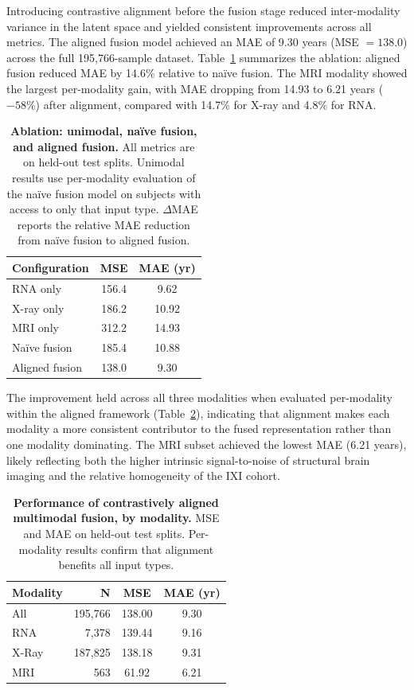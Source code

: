 \documentclass[10pt,twocolumn]{article}
\begin{document}
Introducing contrastive alignment before the fusion stage reduced inter-modality variance in the
latent space and yielded consistent improvements across all metrics. The aligned fusion model
achieved an MAE of 9.30 years (MSE $= 138.0$) across the full 195{,}766-sample
dataset. Table~\ref{tab:ablation} summarizes the ablation: aligned fusion reduced MAE by 14.6\%
relative to na\"ive fusion. The MRI modality showed the largest per-modality gain, with MAE
dropping from 14.93 to 6.21 years ($-58\%$) after alignment, compared with 14.7\% for X-ray
and 4.8\% for RNA.

\begin{table}[t]
\centering
\caption{
\textbf{Ablation: unimodal, na\"ive fusion, and aligned fusion.}
All metrics are on held-out test splits. Unimodal results use per-modality evaluation of the
na\"ive fusion model on subjects with access to only that input type. $\Delta$MAE reports the
relative MAE reduction from na\"ive fusion to aligned fusion.
}
\begin{tabular}{lcc}
\toprule
\textbf{Configuration} & \textbf{MSE} & \textbf{MAE (yr)} \\
\midrule
RNA only       & 156.4 &  9.62 \\
X-ray only     & 186.2 & 10.92 \\
MRI only       & 312.2 & 14.93 \\
\midrule
Na\"ive fusion   & 185.4 & 10.88 \\
Aligned fusion & 138.0 &  9.30 \\
\bottomrule
\end{tabular}
\label{tab:ablation}
\end{table}

The improvement held across all three modalities when evaluated per-modality within the aligned
framework (Table~\ref{tab:per_modality}), indicating that alignment makes each modality a more
consistent contributor to the fused representation rather than one modality dominating. The MRI
subset achieved the lowest MAE (6.21 years), likely reflecting both the higher intrinsic
signal-to-noise of structural brain imaging and the relative homogeneity of the IXI cohort.

\begin{table}[t]
\centering
\caption{
\textbf{Performance of contrastively aligned multimodal fusion, by modality.}
MSE and MAE on held-out test splits. Per-modality results confirm that alignment benefits all
input types.
}
\begin{tabular}{lrcc}
\toprule
\textbf{Modality} & \textbf{N} & \textbf{MSE} & \textbf{MAE (yr)} \\
\midrule
All    & 195,766 & 138.00 & 9.30 \\
RNA    &   7,378 & 139.44 & 9.16 \\
X-Ray  & 187,825 & 138.18 & 9.31 \\
MRI    &     563 &  61.92 & 6.21 \\
\bottomrule
\end{tabular}
\label{tab:per_modality}
\end{table}
\end{document}
